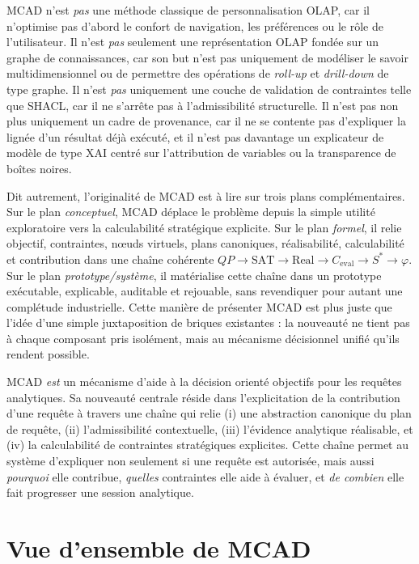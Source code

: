 \documentclass[journal]{IEEEtran}
\begin{document}
MCAD n'est \emph{pas} une méthode classique de personnalisation OLAP, car il n'optimise pas d'abord le confort de navigation, les préférences ou le rôle de l'utilisateur. Il n'est \emph{pas} seulement une représentation OLAP fondée sur un graphe de connaissances, car son but n'est pas uniquement de modéliser le savoir multidimensionnel ou de permettre des opérations de \emph{roll-up} et \emph{drill-down} de type graphe. Il n'est \emph{pas} uniquement une couche de validation de contraintes telle que SHACL, car il ne s'arrête pas à l'admissibilité structurelle. Il n'est pas non plus uniquement un cadre de provenance, car il ne se contente pas d'expliquer la lignée d'un résultat déjà exécuté, et il n'est pas davantage un explicateur de modèle de type XAI centré sur l'attribution de variables ou la transparence de boîtes noires.



Dit autrement, l'originalité de MCAD est à lire sur trois plans complémentaires. Sur le plan \emph{conceptuel}, MCAD déplace le problème depuis la simple utilité exploratoire vers la calculabilité stratégique explicite. Sur le plan \emph{formel}, il relie objectif, contraintes, nœuds virtuels, plans canoniques, réalisabilité, calculabilité et contribution dans une chaîne cohérente $QP \rightarrow \mathrm{SAT} \rightarrow \mathrm{Real} \rightarrow C_{\mathrm{eval}} \rightarrow S^* \rightarrow \varphi$. Sur le plan \emph{prototype/système}, il matérialise cette chaîne dans un prototype exécutable, explicable, auditable et rejouable, sans revendiquer pour autant une complétude industrielle. Cette manière de présenter MCAD est plus juste que l'idée d'une simple juxtaposition de briques existantes : la nouveauté ne tient pas à chaque composant pris isolément, mais au mécanisme décisionnel unifié qu'ils rendent possible.

MCAD \emph{est} un mécanisme d'aide à la décision orienté objectifs pour les requêtes analytiques. Sa nouveauté centrale réside dans l'explicitation de la contribution d'une requête à travers une chaîne qui relie (i) une abstraction canonique du plan de requête, (ii) l'admissibilité contextuelle, (iii) l'évidence analytique réalisable, et (iv) la calculabilité de contraintes stratégiques explicites. Cette chaîne permet au système d'expliquer non seulement si une requête est autorisée, mais aussi \emph{pourquoi} elle contribue, \emph{quelles} contraintes elle aide à évaluer, et \emph{de combien} elle fait progresser une session analytique.

\section{Vue d'ensemble de MCAD}
\label{sec:overview}
\end{document}
